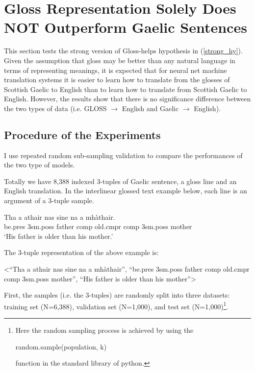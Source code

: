 \section{Gloss Representation Solely Does NOT Outperform Gaelic Sentences} \label{gd_to_gl_to_en}
This section tests the strong version of Gloss-helps hypothesis in (\ref{strong_hy}).
Given the assumption that gloss may be better than any natural language in terms of representing meanings, it is expected that for neural net machine translation systems it is easier to learn how to translate from the glosses of Scottish Gaelic to English than to learn how to translate from Scottish Gaelic to English. However, the results show that there is no significance difference between the two types of data (i.e. GLOSS $\rightarrow$ English and Gaelic $\rightarrow$ English).

\subsection{Procedure of the Experiments}
I use repeated random sub-sampling validation to compare the performances of the two type of models.

Totally we have 8,388 indexed 3-tuples of Gaelic sentence, a gloss line and an English translation. In the interlinear glossed text example below, each line is an argument of a 3-tuple sample.

\begin{exe} 
\ex \gll    Tha a athair nas sine na a mh\`athair.\\ 
           be.pres 3sm.poss father comp old.cmpr comp 3sm.poss mother
\\ 
   \glt    `His father is older than his mother.' 
\end{exe}

The 3-tuple representation of the above example is:
\begin{exe}
\ex <``Tha a athair nas sine na a mh\`athair'', ``be.pres 3sm.poss father comp old.cmpr comp 3sm.poss mother'', ``His father is older than his mother''>
\end{exe}

First, the samples (i.e. the 3-tuples) are randomly split into three datasets: training set (N=6,388), validation set (N=1,000), and test set (N=1,000)\footnote{Here the random sampling process is achieved by using the \begin{myfont}random.sample(population, k)\end{myfont} function in the standard library of python.}.


